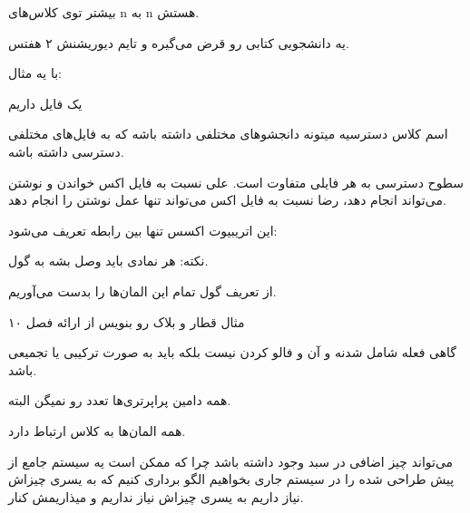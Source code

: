 بیشتر توی کلاس‌های n به n هستش.

یه دانشجویی کتابی رو قرض می‌گیره و تایم دیوریشنش ۲ هفتس.

با یه مثال:

یک فایل داریم

اسم کلاس دسترسیه
میتونه دانجشو‌های مختلفی داشته باشه که به فایل‌های مختلفی دسترسی داشته باشه.

سطوح دسترسی به هر فایلی متفاوت است. علی نسبت به فایل اکس خواندن و نوشتن می‌تواند
انجام دهد، رضا نسبت به فایل اکس می‌تواند تنها عمل نوشتن را انجام دهد.

این اتریبیوت اکسس تنها بین رابطه تعریف می‌شود:




نکته: هر نمادی باید وصل بشه به گول.

از تعریف گول تمام این المان‌ها را بدست می‌آوریم.

مثال قطار و بلاک رو بنویس از ارائه فصل ۱۰

گاهی فعله شامل شدنه و آن و فالو کردن نیست بلکه باید به صورت ترکیبی یا تجمیعی
باشد.

همه دامین پراپرتری‌ها تعدد رو نمیگن البته.

همه المان‌ها به کلاس ارتباط دارد.

می‌تواند چیز اضافی در سبد وجود داشته باشد چرا که ممکن است یه سیستم جامع از پیش
طراحی شده را در سیستم جاری بخواهیم الگو برداری کنیم که به یسری چیزاش نیاز داریم
به یسری چیزاش نیاز نداریم و میذاریمش کنار.